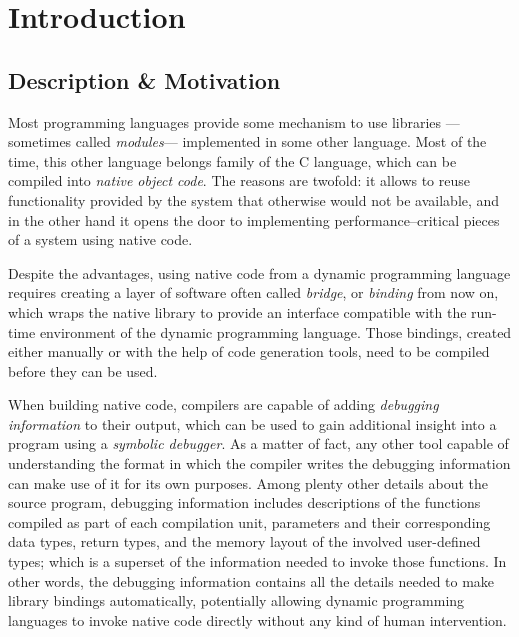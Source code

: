 
\chapter{Introduction}

\section{Description \& Motivation}

Most programming languages provide some mechanism to use libraries —sometimes
called \emph{modules}— implemented in some other language. Most of the time,
this other language belongs family of the C language, which can be compiled
into \emph{native object code}. The reasons are twofold: it allows to reuse
functionality provided by the system that otherwise would not be available,
and in the other hand it opens the door to implementing performance--critical
pieces of a system using native code.

Despite the advantages, using native code from a dynamic programming language
requires creating a layer of software often called \emph{bridge}, or
\emph{binding} from now on, which wraps the native library to provide an
interface compatible with the run-time environment of the dynamic programming
language. Those bindings, created either manually or with the help of code
generation tools, need to be compiled before they can be used.

When building native code, compilers are capable of adding
\emph{debugging information} to their output, which can be used to gain
additional insight into a program using a \emph{symbolic debugger}. As
a matter of fact, any other tool capable of understanding the format in which
the compiler writes the debugging information can make use of it for its own
purposes. Among plenty other details about the source program, debugging
information includes descriptions of the functions compiled as part of each
compilation unit, parameters and their corresponding data types, return types,
and the memory layout of the involved user-defined types; which is a superset
of the information needed to invoke those functions. In other words, the
debugging information contains all the details needed to make library bindings
automatically, potentially allowing dynamic programming languages to invoke
native code directly without any kind of human intervention.



